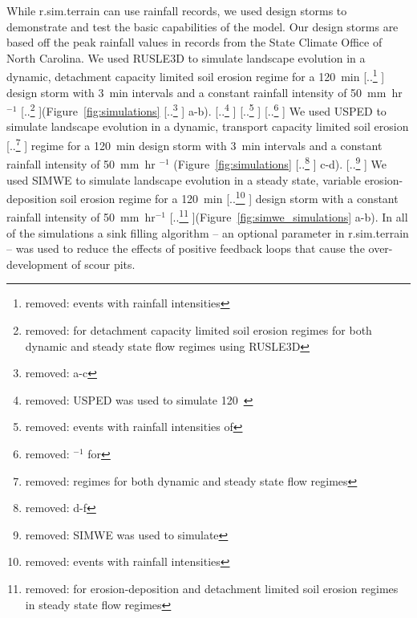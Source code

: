\documentclass[gmd, manuscript]{copernicus}
\providecommand{\DIFadd}[1]{{\protect\color{blue} \sf #1}} %
\providecommand{\DIFdel}[1]{{\protect\color{red} [..\footnote{removed: #1} ]}} %
\providecommand{\DIFaddbegin}{} %
\providecommand{\DIFaddend}{} %
\providecommand{\DIFdelbegin}{} %
\providecommand{\DIFdelend}{} %
\begin{document}
\DIFadd{While r.sim.terrain can use rainfall records,
we used design storms to demonstrate and test 
the basic capabilities of the model. 
Our design storms are based off the peak rainfall values
in records from the State Climate Office of North Carolina.
We used RUSLE3D to simulate landscape evolution
in a dynamic, detachment capacity limited soil erosion regime
for a }\DIFaddend 120~\unit{min} \DIFdelbegin \DIFdel{events
with rainfall intensities }\DIFdelend \DIFaddbegin \DIFadd{design storm
with 3~}\unit{min} \DIFadd{intervals 
and a constant rainfall intensity }\DIFaddend of 50~\unit{mm~hr}$^{-1}$
\DIFdelbegin \DIFdel{for detachment capacity limited soil erosion regimes
for both dynamic and steady state flow regimes
using RUSLE3D
}\DIFdelend (Figure~\ref{fig:simulations}\DIFdelbegin \DIFdel{a-c}\DIFdelend \DIFaddbegin \DIFadd{a-b}\DIFaddend ).
%
\DIFdelbegin \DIFdel{USPED was used to simulate 120~}%
\DIFdel{events
with rainfall intensities of }%
\DIFdel{$^{-1}$
for }\DIFdelend \DIFaddbegin \DIFadd{We used USPED to simulate landscape evolution
in a dynamic, }\DIFaddend transport capacity limited soil erosion \DIFdelbegin \DIFdel{regimes
for both dynamic and steady state flow regimes
}\DIFdelend \DIFaddbegin \DIFadd{regime
for a 120~}\unit{min} \DIFadd{design storm
with 3~}\unit{min} \DIFadd{intervals 
and a constant rainfall intensity of 50~}\unit{mm~hr}\DIFadd{$^{-1}$
}\DIFaddend (Figure~\ref{fig:simulations}\DIFdelbegin \DIFdel{d-f}\DIFdelend \DIFaddbegin \DIFadd{c-d}\DIFaddend ).
%
\DIFdelbegin \DIFdel{SIMWE was used to simulate }\DIFdelend \DIFaddbegin \DIFadd{We used SIMWE to simulate landscape evolution
in a steady state, variable erosion-deposition soil erosion regime
for a }\DIFaddend 120~\unit{min} \DIFdelbegin \DIFdel{events 
with rainfall intensities }\DIFdelend \DIFaddbegin \DIFadd{design storm
with a constant rainfall intensity }\DIFaddend of 50~\unit{mm~hr}$^{-1}$
\DIFdelbegin \DIFdel{for erosion-deposition 
and detachment limited soil erosion regimes 
in steady state flow regimes
}\DIFdelend (Figure~\ref{fig:simwe_simulations}\DIFaddbegin \DIFadd{a-b}\DIFaddend ). 
%
In all of the simulations 
a sink filling algorithm
-- an optional parameter in r.sim.terrain -- 
was used to reduce the effects of positive feedback loops
that cause the over-development of scour pits. 
\end{document}
